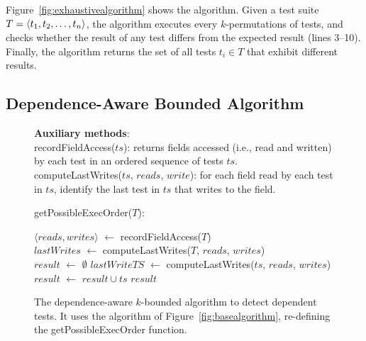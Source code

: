 Figure~\ref{fig:exhaustivealgorithm} shows the algorithm.
Given a test suite $T =  \langle t_1, t_2, \ldots, t_n \rangle $, the
algorithm executes every $k$-permutations of tests,
and checks whether the result of any test differs
from the expected result (lines 3--10). Finally, the algorithm returns the set
of all tests $t_i \in T$
that exhibit different results.





\subsection{Dependence-Aware Bounded Algorithm}
\label{sec:advalgorithm}

\begin{figure}[t]
\textbf{Auxiliary methods}:\\
recordFieldAccess($ts$): returns fields accessed (i.e., read and written) by each test in an ordered sequence of tests $ts$. \\
computeLastWrites($ts$, $reads$, $write$): for each field read by each test in $ts$, identify the last test in $ts$ that writes to the field.\\

\vspace{-2mm}

getPossibleExecOrder($T$):\\
\vspace{-5mm}
\begin{algorithmic}[1]
\STATE $\langle reads, writes\rangle$ $\leftarrow$ recordFieldAccess($T$)\\
\STATE $\mathit{lastWrites}$ $\leftarrow$ computeLastWrites($T$, $\mathit{reads}$, $\mathit{writes}$)
\\
\STATE $\mathit{result}$ $\leftarrow$ $\emptyset$
\STATE $\mathit{lastWriteTS}$ $\leftarrow$ computeLastWrites($ts$, $\mathit{reads}$, $\mathit{writes}$)
\STATE $\mathit{result}$ $\leftarrow$ $\mathit{result} \cup \mathit{ts}$
\ENDIF
\ENDFOR
\RETURN $\mathit{result}$
\end{algorithmic}

\vspace{-3mm}
\caption {The dependence-aware $k$-bounded algorithm to detect dependent tests.
It uses the algorithm of Figure~\ref{fig:basealgorithm}, re-defining the
getPossibleExecOrder function.
} 
\label{fig:impralg}
\end{figure}

